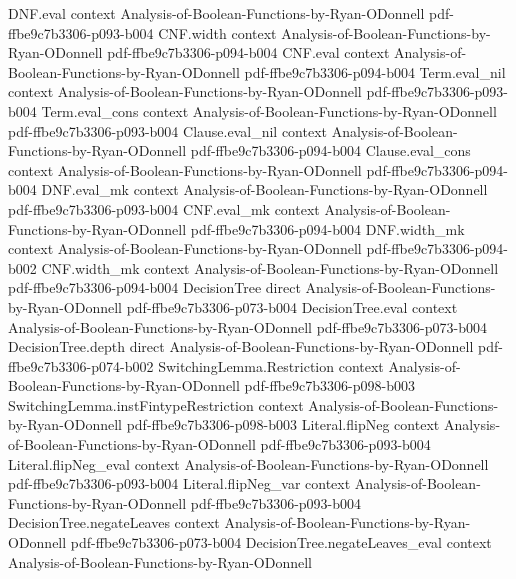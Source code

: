 \begin{theorem}
\proofstep
  {DNF.eval}
  {context}
  {Analysis-of-Boolean-Functions-by-Ryan-ODonnell}
  {pdf-ffbe9c7b3306-p093-b004}
\proofstep
  {CNF.width}
  {context}
  {Analysis-of-Boolean-Functions-by-Ryan-ODonnell}
  {pdf-ffbe9c7b3306-p094-b004}
\proofstep
  {CNF.eval}
  {context}
  {Analysis-of-Boolean-Functions-by-Ryan-ODonnell}
  {pdf-ffbe9c7b3306-p094-b004}
\proofstep
  {Term.eval_nil}
  {context}
  {Analysis-of-Boolean-Functions-by-Ryan-ODonnell}
  {pdf-ffbe9c7b3306-p093-b004}
\proofstep
  {Term.eval_cons}
  {context}
  {Analysis-of-Boolean-Functions-by-Ryan-ODonnell}
  {pdf-ffbe9c7b3306-p093-b004}
\proofstep
  {Clause.eval_nil}
  {context}
  {Analysis-of-Boolean-Functions-by-Ryan-ODonnell}
  {pdf-ffbe9c7b3306-p094-b004}
\proofstep
  {Clause.eval_cons}
  {context}
  {Analysis-of-Boolean-Functions-by-Ryan-ODonnell}
  {pdf-ffbe9c7b3306-p094-b004}
\proofstep
  {DNF.eval_mk}
  {context}
  {Analysis-of-Boolean-Functions-by-Ryan-ODonnell}
  {pdf-ffbe9c7b3306-p093-b004}
\proofstep
  {CNF.eval_mk}
  {context}
  {Analysis-of-Boolean-Functions-by-Ryan-ODonnell}
  {pdf-ffbe9c7b3306-p094-b004}
\proofstep
  {DNF.width_mk}
  {context}
  {Analysis-of-Boolean-Functions-by-Ryan-ODonnell}
  {pdf-ffbe9c7b3306-p094-b002}
\proofstep
  {CNF.width_mk}
  {context}
  {Analysis-of-Boolean-Functions-by-Ryan-ODonnell}
  {pdf-ffbe9c7b3306-p094-b004}
\proofstep
  {DecisionTree}
  {direct}
  {Analysis-of-Boolean-Functions-by-Ryan-ODonnell}
  {pdf-ffbe9c7b3306-p073-b004}
\proofstep
  {DecisionTree.eval}
  {context}
  {Analysis-of-Boolean-Functions-by-Ryan-ODonnell}
  {pdf-ffbe9c7b3306-p073-b004}
\proofstep
  {DecisionTree.depth}
  {direct}
  {Analysis-of-Boolean-Functions-by-Ryan-ODonnell}
  {pdf-ffbe9c7b3306-p074-b002}
\proofstep
  {SwitchingLemma.Restriction}
  {context}
  {Analysis-of-Boolean-Functions-by-Ryan-ODonnell}
  {pdf-ffbe9c7b3306-p098-b003}
\proofstep
  {SwitchingLemma.instFintypeRestriction}
  {context}
  {Analysis-of-Boolean-Functions-by-Ryan-ODonnell}
  {pdf-ffbe9c7b3306-p098-b003}
\proofstep
  {Literal.flipNeg}
  {context}
  {Analysis-of-Boolean-Functions-by-Ryan-ODonnell}
  {pdf-ffbe9c7b3306-p093-b004}
\proofstep
  {Literal.flipNeg_eval}
  {context}
  {Analysis-of-Boolean-Functions-by-Ryan-ODonnell}
  {pdf-ffbe9c7b3306-p093-b004}
\proofstep
  {Literal.flipNeg_var}
  {context}
  {Analysis-of-Boolean-Functions-by-Ryan-ODonnell}
  {pdf-ffbe9c7b3306-p093-b004}
\proofstep
  {DecisionTree.negateLeaves}
  {context}
  {Analysis-of-Boolean-Functions-by-Ryan-ODonnell}
  {pdf-ffbe9c7b3306-p073-b004}
\proofstep
  {DecisionTree.negateLeaves_eval}
  {context}
  {Analysis-of-Boolean-Functions-by-Ryan-ODonnell}

\end{theorem}

